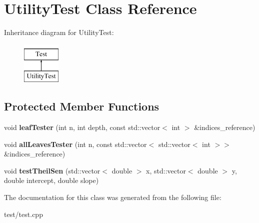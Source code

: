 \hypertarget{class_utility_test}{}\section{Utility\+Test Class Reference}
\label{class_utility_test}
Inheritance diagram for Utility\+Test\+:\begin{figure}[H]
\begin{center}
\leavevmode
\includegraphics[height=2.000000cm]{class_utility_test}
\end{center}
\end{figure}
\subsection*{Protected Member Functions}
\begin{DoxyCompactItemize}
\item 
\mbox{\label{class_utility_test_a2eb9bcd1dbd5eb5e2a35477ff7d80571}} 
void {\bfseries leaf\+Tester} (int n, int depth, const std\+::vector$<$ int $>$ \&indices\+\_\+reference)
\item 
\mbox{\label{class_utility_test_ac195e9a5bada5bef6ea273ca6f7105d9}} 
void {\bfseries all\+Leaves\+Tester} (int n, const std\+::vector$<$ std\+::vector$<$ int $>$$>$ \&indices\+\_\+reference)
\item 
\mbox{\label{class_utility_test_af6666fec149c33f92bb64baa37d491c1}} 
void {\bfseries test\+Theil\+Sen} (std\+::vector$<$ double $>$ x, std\+::vector$<$ double $>$ y, double intercept, double slope)
\end{DoxyCompactItemize}


The documentation for this class was generated from the following file\+:\begin{DoxyCompactItemize}
\item 
test/test.\+cpp\end{DoxyCompactItemize}
